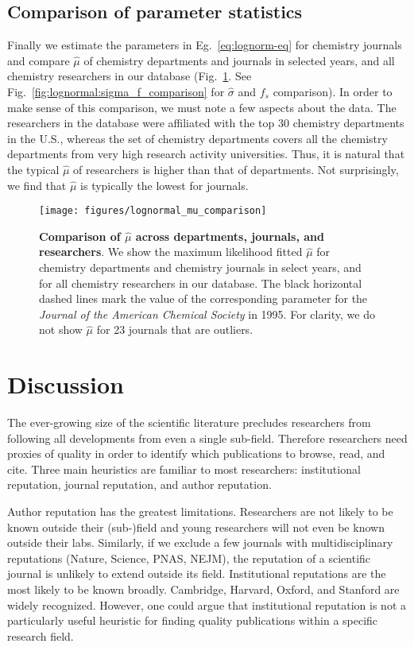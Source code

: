 \subsection{Comparison of parameter statistics}

Finally we estimate the parameters in Eg.~\eqref{eq:lognorm-eq} for chemistry journals and compare $\hat{\mu}$ of chemistry departments and journals in selected years, and all chemistry researchers in our database (Fig.~\ref{fig:lognormal:mu_comparison}. See Fig.~\ref{fig:lognormal:sigma_f_comparison} for $\hat{\sigma}$ and $f_s$ comparison). In order to make sense of this comparison, we must note a few aspects about the data. The researchers in the database were affiliated with the top 30 chemistry departments in the U.S., whereas the set of chemistry departments covers all the chemistry departments from very high research activity universities. Thus, it is natural that the typical $\hat{\mu}$ of researchers is higher than that of departments. Not surprisingly, we find that $\hat{\mu}$ is typically the lowest for journals.

\begin{figure}[t]
\texttt{[image: figures/lognormal\_mu\_comparison]}
\caption[Comparison of $\hat{\mu}$ across departments, journals, and researchers.]{\textbf{Comparison of $\hat{\mu}$ across departments, journals, and researchers}. We show the maximum likelihood fitted $\hat{\mu}$ for chemistry departments and chemistry journals in select years, and for all chemistry researchers in our database. The black horizontal dashed lines mark the value of the corresponding parameter for the \textit{Journal of the American Chemical Society} in 1995. For clarity, we do not show $\hat{\mu}$ for 23 journals that are outliers.}
\label{fig:lognormal:mu_comparison}
\end{figure}


\section{Discussion}

The ever-growing size of the scientific literature precludes researchers from following all developments from even a single sub-field. Therefore researchers need proxies of quality in order to identify which publications to browse, read, and cite. Three main heuristics are familiar to most researchers: institutional reputation, journal reputation, and author reputation.

Author reputation has the greatest limitations. Researchers are not likely to be known outside their (sub-)field and young researchers will not even be known outside their labs. Similarly, if we exclude a few journals with multidisciplinary reputations (Nature, Science, PNAS, NEJM), the reputation of a scientific journal is unlikely to extend outside its field. Institutional reputations are the most likely to be known broadly. Cambridge, Harvard, Oxford, and Stanford are widely recognized. However, one could argue that institutional reputation is not a particularly useful heuristic for finding quality publications within a specific research field.

